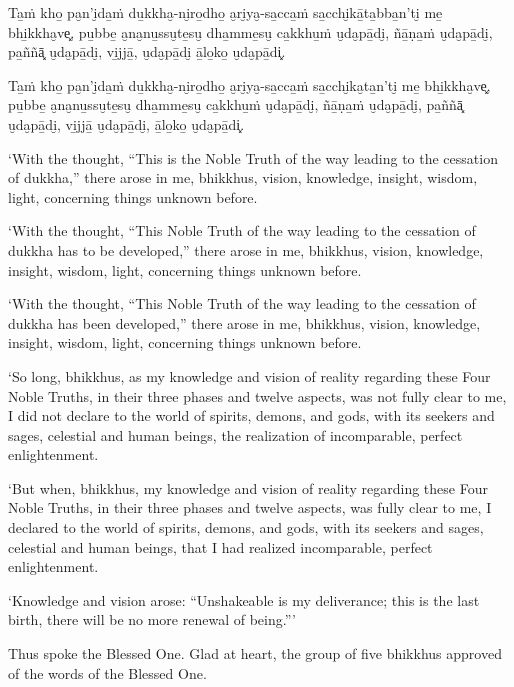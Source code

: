 Ta̱ṁ kho̱ pa̮n'i̮da̱ṁ du̱kkha̮-ni̮ro̱dho̱ a̮ri̮ya̮-sa̱cca̱ṁ sa̱cchi̮kā̱ta̱bba̱n'ti̮ me̱ bhi̱kkha̮ve͓,
pu̱bbe̱ a̮na̮nu̱ssu̮te̱su̮ dha̱mme̱su̮ ca̱kkhu̱ṁ u̮da̮pā̱di̮, ñā̱ṇa̱ṁ u̮da̮pā̱di̮, pa̱ññā͓
u̮da̮pā̱di̮, vi̱jjā̱, u̮da̮pā̱di̮ ā̱lo̱ko̱ u̮da̮pā̱di͓.

Ta̱ṁ kho̱ pa̮n'i̮da̱ṁ du̱kkha̮-ni̮ro̱dho̱ a̮ri̮ya̮-sa̱cca̱ṁ sa̱cchi̮ka̮ta̱n'ti̮ me̱ bhi̱kkha̮ve͓,
pu̱bbe̱ a̮na̮nu̱ssu̮te̱su̮ dha̱mme̱su̮ ca̱kkhu̱ṁ u̮da̮pā̱di̮, ñā̱ṇa̱ṁ u̮da̮pā̱di̮, pa̱ññā͓
u̮da̮pā̱di̮, vi̱jjā̱ u̮da̮pā̱di̮, ā̱lo̱ko̱ u̮da̮pā̱di͓.

\clearpage

\englishText
\markboth{\englishTitle}{\rightmark}

‘With the thought, “This is the Noble Truth of the way leading to the
cessation of dukkha,” there arose in me, bhikkhus, vision, knowledge,
insight, wisdom, light, concerning things unknown before.

‘With the thought, “This Noble Truth of the way leading to the cessation
of dukkha has to be developed,” there arose in me, bhikkhus, vision,
knowledge, insight, wisdom, light, concerning things unknown before.

‘With the thought, “This Noble Truth of the way leading to the cessation
of dukkha has been developed,” there arose in me, bhikkhus, vision,
knowledge, insight, wisdom, light, concerning things unknown before.

‘So long, bhikkhus, as my knowledge and vision of reality regarding
these Four Noble Truths, in their three phases and twelve aspects, was
not fully clear to me, I did not declare to the world of spirits,
demons, and gods, with its seekers and sages, celestial and human
beings, the realization of incomparable, perfect enlightenment.

‘But when, bhikkhus, my knowledge and vision of reality regarding these
Four Noble Truths, in their three phases and twelve aspects, was fully
clear to me, I declared to the world of spirits, demons, and gods, with
its seekers and sages, celestial and human beings, that I had realized
incomparable, perfect enlightenment.

‘Knowledge and vision arose: “Unshakeable is my deliverance; this is
the last birth, there will be no more renewal of being.”\thinspace ’

Thus spoke the Blessed One. Glad at heart, the group of five bhikkhus
approved of the words of the Blessed One.

\clearpage

\paliText
\markboth{\paliTitle}{\rightmark}

